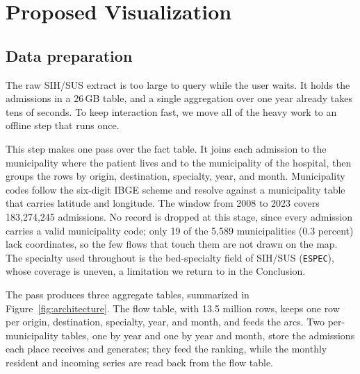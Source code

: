 \section{Proposed Visualization}
\label{sec:design}

\subsection{Data preparation}

The raw SIH/SUS extract is too large to query while the user waits.
It holds the admissions in a 26\,GB table, and a single aggregation over one year already takes tens of seconds.
To keep interaction fast, we move all of the heavy work to an offline step that runs once.

This step makes one pass over the fact table.
It joins each admission to the municipality where the patient lives and to the municipality of the hospital, then groups the rows by origin, destination, specialty, year, and month.
Municipality codes follow the six-digit IBGE scheme and resolve against a municipality table that carries latitude and longitude.
The window from 2008 to 2023 covers 183{,}274{,}245 admissions.
No record is dropped at this stage, since every admission carries a valid municipality code; only 19 of the 5{,}589 municipalities (0.3 percent) lack coordinates, so the few flows that touch them are not drawn on the map.
The specialty used throughout is the bed-specialty field of SIH/SUS (\texttt{ESPEC}), whose coverage is uneven, a limitation we return to in the Conclusion.

The pass produces three aggregate tables, summarized in Figure~\ref{fig:architecture}.
The flow table, with 13.5 million rows, keeps one row per origin, destination, specialty, year, and month, and feeds the arcs.
Two per-municipality tables, one by year and one by year and month, store the admissions each place receives and generates; they feed the ranking, while the monthly resident and incoming series are read back from the flow table.

